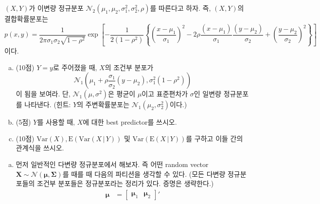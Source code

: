 \documentclass[answers]{exam}
\newcommand{\bs}{\boldsymbol}
\begin{document}
\newpage
{}
\begin{questions}
   \question
   $\left(X,Y\right)$가 이변량 정규분포 $\mathcal{N}_{2}\left(\mu_{1},\mu_{2},\sigma_{1}^{2},\sigma_{2}^{2},\rho\right)$를 따른다고 하자. 즉, $\left(X,Y\right)$의 결합확률분포는
   \begin{equation}
    p\left(x,y\right) =\dfrac{1}{2\pi\sigma_{1}\sigma_{2}\sqrt{1-\rho^{2}}}\exp\left[-\dfrac{1}{2\left(1-\rho^{2}\right)}\left\{\left(\dfrac{x-\mu_{1}}{\sigma_{1}}\right)^{2}-2\rho\dfrac{\left(x-\mu_{1}\right)}{\sigma_{1}}\dfrac{\left(y-\mu_{2}\right)}{\sigma_{2}}+\left(\dfrac{y-\mu_{2}}{\sigma_{2}}\right)^{2}\right\}\right]
   \end{equation}
   이다.
   \begin{enumerate}[(a)]
    \item (10점) $Y=y$로 주어졌을 때, $X$의 조건부 분포가
    \begin{equation}
      \mathcal{N}_{1}\left(\mu_{1}+\rho\dfrac{\sigma_{1}}{\sigma_{2}}\left(y-\mu_{2}\right),\sigma_{1}^{2}\left(1-\rho^{2}\right)\right)
    \end{equation}
    이 됨을 보여라. 단, $\mathcal{N}_{1}\left(\mu,\sigma^{2}\right)$은 평균이 $\mu$이고 표준편차가 $\sigma$인 일변량 정규분포를 나타낸다. (힌트: $Y$의 주변확률분포는 $\mathcal{N}_{1}\left(\mu_{2},\sigma_{2}^{2}\right)$이다.)
    \item (5점) $Y$를 사용할 때, $X$에 대한 best predictor를 쓰시오.
    \item (10점) $\mathrm{Var}\left(X\right), \mathrm{E}\left(\mathrm{Var}\left(X\,|\,Y\right)\right)$ 및 $\mathrm{Var}\left(\mathrm{E}\left(X\,|\,Y\right)\right)$를 구하고 이들 간의 관계식을 쓰시오.
   \end{enumerate}
   \begin{solution}
    \begin{enumerate}[(a)]
      \item 먼저 일반적인 다변량 정규분포에서 해보자. 즉 어떤 random vector $\mathbf{X}\sim\mathcal{N}\left(\bs{\mu},\bs{\Sigma}\right)$를 때를 때 다음의 파티션을 생각할 수 있다. (모든 다변량 정규분포들의 조건부 분포들은 정규분포라는 정리가 있다. 증명은 생략한다.)
      \begin{align}
        \bs{\mu} &= \begin{bmatrix}\bs{\mu}_{1}&\bs{\mu}_{2}\end{bmatrix}'\\

\end{align}
\end{enumerate}
\end{solution}
\end{questions}
\end{document}
